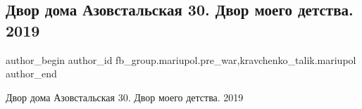  
 
 
 
 

\subsection{Двор дома Азовстальская 30. Двор моего детства. 2019}
\label{sec:16_02_2023.fb.fb_group.mariupol.pre_war.2.dvor_doma_azovstalsk}
 
\ifcmt
 author_begin
   author_id fb_group.mariupol.pre_war,kravchenko_talik.mariupol
 author_end
\fi

Двор дома Азовстальская 30. Двор моего детства. 2019

